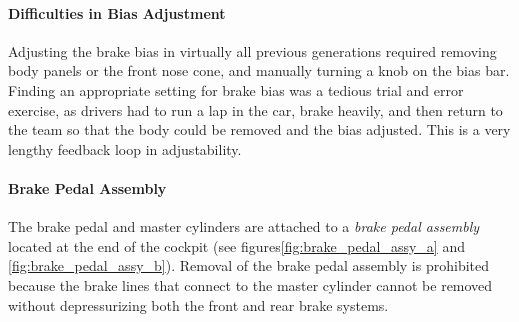 \paragraph{Difficulties in Bias Adjustment}

Adjusting the brake bias in virtually all previous generations required removing body panels or the front nose cone, and manually turning a knob on the bias bar. Finding an appropriate setting for brake bias was a tedious trial and error exercise, as drivers had to run a lap in the car, brake heavily, and then return to the team so that the body could be removed and the bias adjusted. This is a very lengthy feedback loop in adjustability.

\paragraph{Brake Pedal Assembly}

The brake pedal and master cylinders are attached to a \emph{brake pedal assembly} located at the end of the cockpit (see figures\ref{fig:brake_pedal_assy_a} and \ref{fig:brake_pedal_assy_b}). Removal of the brake pedal assembly is prohibited because the brake lines that connect to the master cylinder cannot be removed without depressurizing both the front and rear brake systems. 

